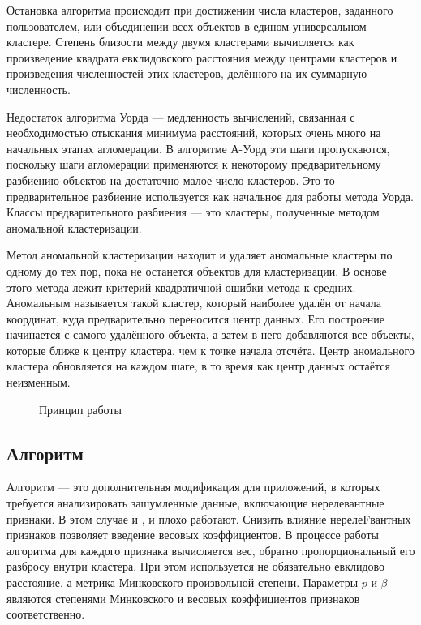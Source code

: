 \documentclass[12pt,tikz]{instruction}
\begin{document}
Остановка алгоритма происходит при достижении числа кластеров, заданного пользователем, или объединении всех объектов в едином универсальном кластере. Степень близости между двумя кластерами вычисляется как произведение квадрата евклидовского расстояния между центрами кластеров и произведения численностей этих кластеров, делённого на их суммарную численность. 

Недостаток алгоритма Уорда --- медленность вычислений, связанная с необходимостью отыскания минимума расстояний, которых очень много на начальных этапах агломерации. В алгоритме А-Уорд эти шаги пропускаются, поскольку шаги агломерации применяются к некоторому предварительному разбиению объектов на достаточно малое число кластеров. Это-то предварительное разбиение используется как начальное для работы метода Уорда. Классы предварительного разбиения --- это кластеры, полученные методом аномальной кластеризации.

Метод аномальной кластеризации находит и удаляет аномальные кластеры по одному до тех пор, пока не останется объектов для кластеризации. В основе этого метода лежит критерий квадратичной ошибки метода к-средних. Аномальным называется такой кластер, который наиболее удалён от начала координат, куда предварительно переносится центр данных. Его построение начинается с самого удалённого объекта, а затем в него добавляются все объекты, которые ближе к центру кластера, чем к точке начала отсчёта. Центр аномального кластера обновляется на каждом шаге, в то время как центр данных остаётся неизменным.

\begin{figure} %
	\centering
	\subfigure[]{\label{fig:ward1}}
	\subfigure[]{\label{fig:ward2}}
	\subfigure[]{\label{fig:ward3}}
	\subfigure[]{\label{fig:ward4}}
	\subfigure[]{\label{fig:ward3}}
	\subfigure[]{\label{fig:ward4}}
	\caption{Принцип работы \AWard}
	\label{fig:ward-working}
\end{figure}




\subsection{Алгоритм  \AWardpb}
Алгоритм \AWardpb --- это дополнительная модификация для приложений, в которых требуется анализировать зашумленные данные, включающие нерелевантные признаки. В этом случае и \Ward, и \AWard плохо работают. Снизить влияние нерелеFвантных признаков позволяет введение весовых коэффициентов. В процессе работы алгоритма \AWardpb для каждого признака вычисляется вес, обратно пропорциональный его разбросу  внутри кластера. При этом используется не обязательно евклидово расстояние, а метрика Минковского произвольной степени. Параметры $ p $ и  $ \beta $ являются степенями Минковского и 
весовых коэффициентов признаков соответственно.
\end{document}
